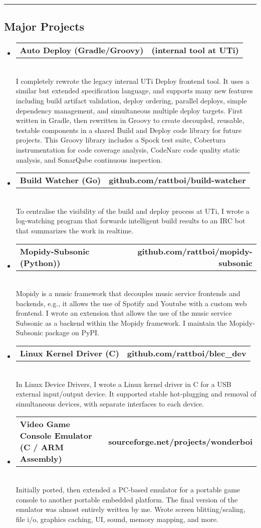 \documentclass[10pt,letterpaper]{article}
\makeatletter
\newcommand{\headerrow}[2]
{\begin{tabular*}{\linewidth}{l@{\extracolsep{\fill}}r}
	#1 &
	#2 \\
\end{tabular*}}
\makeatother
\begin{document}
\hrule
\vspace{-0.4em}
\subsection*{Major Projects}
\begin{itemize}
  \item 
  \headerrow 
  {\textbf{Auto Deploy (Gradle/Groovy)}}
  {\textbf{(internal tool at UTi)}}
  \\
  I completely rewrote the legacy internal UTi Deploy frontend tool. It uses a similar but extended specification language, and supports many new features including build artifact validation, deploy ordering, parallel deploys, simple dependency management, and simultaneous multiple deploy targets. First written in Gradle, then rewritten in Groovy to create decoupled, reusable, testable components in a shared Build and Deploy code library for future projects. This Groovy library includes a Spock test suite, Cobertura instrumentation for code coverage analysis, CodeNarc code quality static analysis, and SonarQube continuous inspection.
  \item 
  \headerrow 
  {\textbf{Build Watcher (Go)}}
  {\textbf{github.com/rattboi/build-watcher}}
  \\
  To centralise the visibility of the build and deploy process at UTi, I wrote a log-watching program that forwards intelligent build results to an IRC bot that summarizes the work in realtime.
  \item 
  \headerrow 
  {\textbf{Mopidy-Subsonic (Python))}}
  {\textbf{github.com/rattboi/mopidy-subsonic}}
  \\
  Mopidy is a music framework that decouples music service frontends and backends, e.g., it allows the use of Spotify and Youtube with a custom web frontend. I wrote an extension that allows the use of the music service Subsonic as a backend within the Mopidy framework. I maintain the Mopidy-Subsonic package on PyPI.
  \item 
  \headerrow 
  {\textbf{Linux Kernel Driver (C)}}
  {\textbf{github.com/rattboi/blec\_dev}}
  \\
  In Linux Device Drivers, I wrote a Linux kernel driver in C for a USB external input/output device. It supported stable hot-plugging and removal of simultaneous devices, with separate interfaces to each device.
  \item 
  \headerrow 
  {\textbf{Video Game Console Emulator (C / ARM Assembly)}}
  {\textbf{sourceforge.net/projects/wonderboi}}
  \\
  Initially ported, then extended a PC-based emulator for a portable game console to another portable embedded platform. The final version of the emulator was almost entirely written by me. Wrote screen blitting/scaling, file i/o, graphics caching, UI, sound, memory mapping, and more.
\end{itemize}
\end{document}
